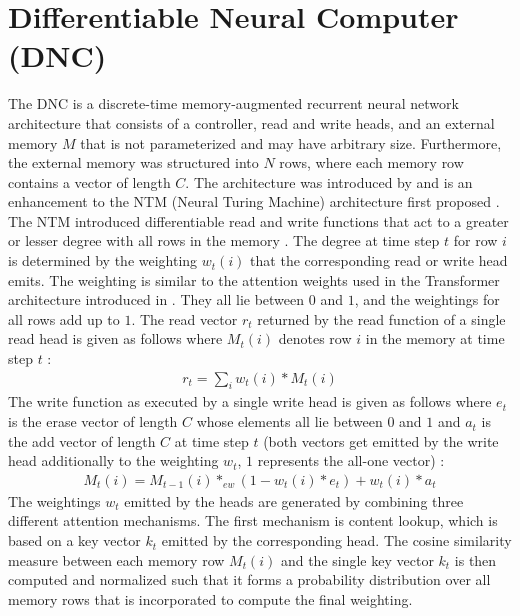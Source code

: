\documentclass[draft,final]{vutinfth} %
\begin{document}
    \section{Differentiable Neural Computer (DNC)} \label{dnc}
    The DNC is a discrete-time memory-augmented recurrent neural network architecture that consists of a controller, read and write heads, and an external memory $M$ that is not parameterized and may have arbitrary size.
    Furthermore, the external memory was structured into $N$ rows, where each memory row contains a vector of length $C$.
    The architecture was introduced by \cite{DNC} and is an enhancement to the NTM (Neural Turing Machine) architecture first proposed \cite{NTM}.
    The NTM introduced differentiable read and write functions that act to a greater or lesser degree with all rows in the memory \cite[p. 5]{NTM}.
    The degree at time step $t$ for row $i$ is determined by the weighting $w_t(i)$ that the corresponding read or write head emits.
    The weighting is similar to the attention weights used in the Transformer architecture introduced in . They all lie between $0$ and $1$, and the weightings for all rows add up to $1$.
    The read vector $r_t$ returned by the read function of a single read head is given as follows where $M_t(i)$ denotes row $i$ in the memory at time step $t$ \cite[p. 1]{DNC}:
    \begin{align}
        \label{dnc_read}
        r_t = \sum_i{w_t(i) * M_t(i)}
    \end{align}
    The write function as executed by a single write head is given as follows where $e_t$ is the erase vector of length $C$ whose elements all lie between $0$ and $1$ and $a_t$ is the add vector of length $C$ at time step $t$ (both vectors get emitted by the write head additionally to the weighting $w_t$, $1$ represents the all-one vector) \cite[p. 1]{DNC}:
    \begin{align}
        \label{dnc_write}
        M_t(i) = M_{t-1}(i) *_{ew} (1 - w_t(i) * e_t) + w_t(i) * a_t
    \end{align}
    The weightings $w_t$ emitted by the heads are generated by combining three different attention mechanisms.
    The first mechanism is content lookup, which is based on a key vector $k_t$ emitted by the corresponding head.
    The cosine similarity measure between each memory row $M_t(i)$ and the single key vector $k_t$ is then computed and normalized such that it forms a probability distribution over all memory rows that is incorporated to compute the final weighting.
\end{document}
